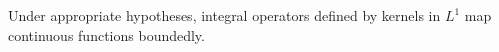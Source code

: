 Under appropriate hypotheses, integral operators defined by kernels in $L^1$ map continuous functions boundedly.
